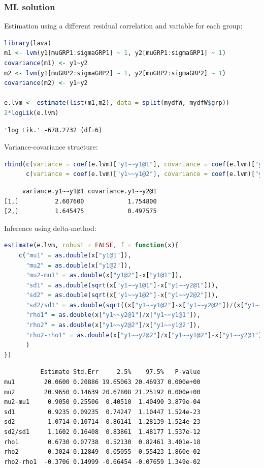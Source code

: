 \documentclass{article}
\begin{document}
\clearpage
\subsubsection{ML solution}
\label{sec:orgecc4d3f}
Estimation using a different residual correlation and variable for each group:
\begin{lstlisting}[language=r,numbers=none]
library(lava)
m1 <- lvm(y1[muGRP1:sigmaGRP1] ~ 1, y2[muGRP1:sigmaGRP1] ~ 1)
covariance(m1) <- y1~y2
m2 <- lvm(y1[muGRP2:sigmaGRP2] ~ 1, y2[muGRP2:sigmaGRP2] ~ 1)
covariance(m2) <- y1~y2

e.lvm <- estimate(list(m1,m2), data = split(mydfW, mydfW$grp))
2*logLik(e.lvm)
\end{lstlisting}

\label{}
\begin{verbatim}
'log Lik.' -678.2732 (df=6)
\end{verbatim}


Variance-covariance structure:
\begin{lstlisting}[language=r,numbers=none]
rbind(c(variance = coef(e.lvm)["y1~~y1@1"], covariance = coef(e.lvm)["y1~~y2@1"]),
      c(variance = coef(e.lvm)["y1~~y1@2"], covariance = coef(e.lvm)["y1~~y2@2"]))
\end{lstlisting}

\label{}
\begin{verbatim}
     variance.y1~~y1@1 covariance.y1~~y2@1
[1,]          2.607600            1.754800
[2,]          1.645475            0.497575
\end{verbatim}


Inference using delta-method:
\begin{lstlisting}[language=r,numbers=none]
estimate(e.lvm, robust = FALSE, f = function(x){
    c("mu1" = as.double(x["y1@1"]),
      "mu2" = as.double(x["y1@2"]),
      "mu2-mu1" = as.double(x["y1@2"]-x["y1@1"]),
      "sd1" = as.double(sqrt(x["y1~~y1@1"]-x["y1~~y2@1"])),
      "sd2" = as.double(sqrt(x["y1~~y1@2"]-x["y1~~y2@2"])),
      "sd2/sd1" = as.double(sqrt((x["y1~~y1@2"]-x["y1~~y2@2"])/(x["y1~~y1@1"]-x["y1~~y2@1"]))),
      "rho1" = as.double(x["y1~~y2@1"]/x["y1~~y1@1"]),
      "rho2" = as.double(x["y1~~y2@2"]/x["y1~~y1@2"]),
      "rho2-rho1" = as.double(x["y1~~y2@2"]/x["y1~~y1@2"]-x["y1~~y2@1"]/x["y1~~y1@1"])
      )
})
\end{lstlisting}

\label{}
\begin{verbatim}
          Estimate Std.Err     2.5%    97.5%   P-value
mu1        20.0600 0.20886 19.65063 20.46937 0.000e+00
mu2        20.9650 0.14639 20.67808 21.25192 0.000e+00
mu2-mu1     0.9050 0.25506  0.40510  1.40490 3.879e-04
sd1         0.9235 0.09235  0.74247  1.10447 1.524e-23
sd2         1.0714 0.10714  0.86141  1.28139 1.524e-23
sd2/sd1     1.1602 0.16408  0.83861  1.48177 1.537e-12
rho1        0.6730 0.07738  0.52130  0.82461 3.401e-18
rho2        0.3024 0.12849  0.05055  0.55423 1.860e-02
rho2-rho1  -0.3706 0.14999 -0.66454 -0.07659 1.349e-02
\end{verbatim}
\end{document}
